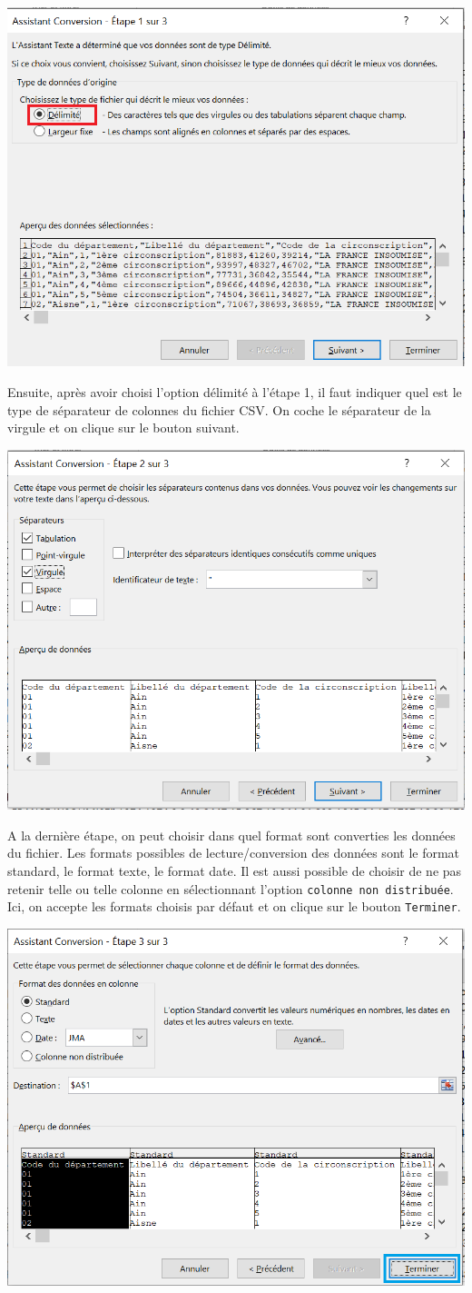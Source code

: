 \documentclass[
]{article}
\begin{document}
\begin{center}\includegraphics[width=0.5\linewidth]{fig/assistant_conversion_1_3} \end{center}

Ensuite, après avoir choisi l'option délimité à l'étape 1, il faut
indiquer quel est le type de séparateur de colonnes du fichier CSV. On
coche le séparateur de la virgule et on clique sur le bouton suivant.

\begin{center}\includegraphics[width=0.5\linewidth]{fig/assistant_conversion_2_3} \end{center}

A la dernière étape, on peut choisir dans quel format sont converties
les données du fichier. Les formats possibles de lecture/conversion des
données sont le format standard, le format texte, le format date. Il est
aussi possible de choisir de ne pas retenir telle ou telle colonne en
sélectionnant l'option \texttt{colonne\ non\ distribuée}. Ici, on
accepte les formats choisis par défaut et on clique sur le bouton
\texttt{Terminer}.

\begin{center}\includegraphics[width=0.5\linewidth]{fig/assistant_conversion_3_3} \end{center}
\end{document}
